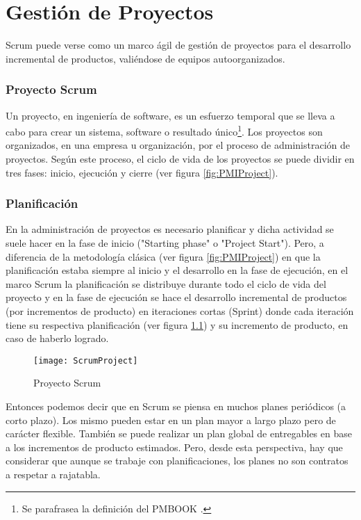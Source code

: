 \chapter{Gestión de Proyectos}

Scrum puede verse como un marco ágil de gestión de proyectos para el desarrollo incremental de productos, valiéndose de equipos autoorganizados. 



\subsection{Proyecto Scrum}

Un proyecto, en ingeniería de software, es un esfuerzo temporal que se lleva a cabo para crear un sistema, software o resultado único\footnote{Se parafrasea la definición del PMBOOK \cite{PMBOK-2004}.}. Los proyectos son organizados, en una empresa u organización, por el proceso de administración de proyectos. Según este proceso, el ciclo de vida de los proyectos se puede dividir en tres fases: inicio, ejecución y cierre (ver figura \ref{fig:PMIProject}). 

\subsection{Planificación}

En la administración de proyectos es necesario planificar y dicha actividad se suele hacer en la fase de inicio ("Starting phase" o "Project Start"). Pero, a diferencia de la metodología clásica (ver figura \ref{fig:PMIProject}) en que la planificación estaba siempre al inicio y el desarrollo en la fase de ejecución, en el marco Scrum la planificación se distribuye durante todo el ciclo de vida del proyecto y en la fase de ejecución se hace el desarrollo incremental de productos (por incrementos de producto) en iteraciones cortas (Sprint) donde cada iteración tiene su respectiva planificación (ver figura \ref{fig:ScrumProject}) y su incremento de producto, en caso de haberlo logrado.

\begin{figure}[h]
  \centering
  \texttt{[image: ScrumProject]}
  \caption{Proyecto Scrum}
  \centering
  \label{fig:ScrumProject} %
\end{figure}

Entonces podemos decir que en Scrum se piensa en muchos planes periódicos (a corto plazo). Los mismo pueden estar en un plan mayor a largo plazo pero de carácter flexible. También se puede realizar un plan global de entregables en base a los incrementos de producto estimados. Pero, desde esta perspectiva, hay que considerar que aunque se trabaje con planificaciones, los planes no son contratos a respetar a rajatabla.


